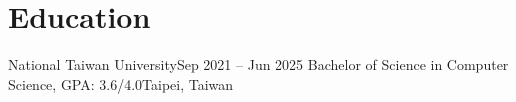 \section{Education}
    \resumeSubHeadingListStart

    \resumeSubheading
    {National Taiwan University}{Sep 2021 -- Jun 2025}
    {Bachelor of Science in Computer Science, GPA: 3.6/4.0}{Taipei, Taiwan}

    \resumeSubHeadingListEnd
